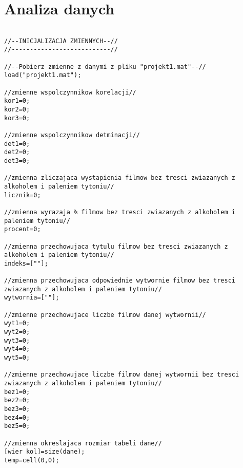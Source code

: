\documentclass[a4paper, 11pt]{article}
\begin{document}
\section{Analiza danych}
\begin{lstlisting}

//--INICJALIZACJA ZMIENNYCH--//
//---------------------------//

//--Pobierz zmienne z danymi z pliku "projekt1.mat"--//
load("projekt1.mat");

//zmienne wspolczynnikow korelacji//
kor1=0;
kor2=0;
kor3=0;

//zmienne wspolczynnikow detminacji//
det1=0;
det2=0;
det3=0;

//zmienna zliczajaca wystapienia filmow bez tresci zwiazanych z alkoholem i paleniem tytoniu//
licznik=0;

//zmienna wyrazaja % filmow bez tresci zwiazanych z alkoholem i paleniem tytoniu//
procent=0;

//zmienna przechowujaca tytulu filmow bez tresci zwiazanych z alkoholem i paleniem tytoniu//
indeks=[""];

//zmienna przechowujaca odpowiednie wytwornie filmow bez tresci zwiazanych z alkoholem i paleniem tytoniu//
wytwornia=[""];

//zmienne przechowujace liczbe filmow danej wytwornii//
wyt1=0;
wyt2=0;
wyt3=0;
wyt4=0;
wyt5=0;

//zmienne przechowujace liczbe filmow danej wytwornii bez tresci zwiazanych z alkoholem i paleniem tytoniu//
bez1=0;
bez2=0;
bez3=0;
bez4=0;
bez5=0;

//zmienna okreslajaca rozmiar tabeli dane//
[wier kol]=size(dane);
temp=cell(0,0);

\end{lstlisting}
\end{document}
